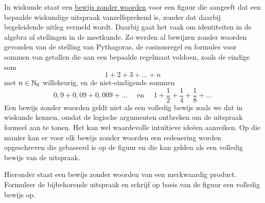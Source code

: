 \documentclass{ximera}
\begin{document}
\begin{Uitbreiding}
\begin{exercise}
In wiskunde staat een \underline{bewijs zonder woorden} voor een figuur die aangeeft dat een bepaalde wiskundige uitspraak vanzelfsprekend is, zonder dat daarbij begeleidende uitleg vermeld wordt. Daarbij gaat het vaak om identiteiten in de algebra of stellingen in de meetkunde. Zo werden al bewijzen zonder woorden gevonden van de stelling van Pythagoras, de cosinusregel en formules voor sommen van getallen die aan een bepaalde regelmaat voldoen, zoals de eindige som 
\[
1 + 2 + 3 + \dots + n 
\]
met \(n \in \N_0\) willekeurig, en de niet-eindigende sommen 
\[
0,9 + 0,09 + 0,009 + \dots \quad \text{ en } \quad 1 + \frac{1}{2} + \frac{1}{4} + \frac{1}{8} + \dots
\]
Een bewijs zonder woorden geldt niet als een volledig bewijs zoals we dat in wiskunde kennen, omdat de logische argumenten ontbreken om de uitspraak formeel aan te tonen. Het kan wel waardevolle intuïtieve ideëen aanreiken. Op die manier kan er voor elk bewijs zonder woorden een redenering worden opgeschreven die gebaseerd is op de figuur en die kan gelden als een volledig bewijs van de uitspraak. 

Hieronder staat een bewijs zonder woorden van een merkwaardig product. Formuleer de bijbehorende uitspraak en schrijf op basis van de figuur een volledig bewijs op.







\begin{image}[\width]
	\begin{tikzpicture}[x=0.5cm, y=0.5cm]


\end{tikzpicture}
\end{image}
\end{exercise}
\end{Uitbreiding}
\end{document}
